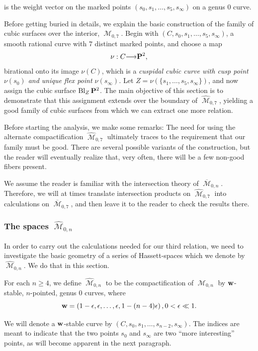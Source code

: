 \documentclass[12pt,reqno]{amsart}
\DeclareMathOperator{\Bl}{Bl}
\DeclareMathOperator{\M}{\mathcal{M}}
\renewcommand{\to}{{\longrightarrow}}
\numberwithin{equation}{section}
\newcommand{\hM}{\widehat{\M}}
\renewcommand {\o}[1]{\overline{#1}}
\begin{document}
is the weight vector on the marked points
$(s_{0}, s_{1}, \dots, s_{5}, s_{\infty})$ on a genus $0$ curve.

Before getting buried in details, we explain the basic construction of
the family of cubic surfaces over the interior, $\M_{0,7}$.  Begin
with $(C, s_{0}, s_{1}, \dots, s_{5}, s_{\infty})$, a smooth rational
curve with $7$ distinct marked points, and choose a map
$$\nu: C \to \P^{2},$$ birational onto its image
$\nu(C)$, which is a {\sl cuspidal cubic curve with cusp point
  $\nu(s_{0})$ and unique flex point $\nu(s_{\infty})$.}  Let
$Z = \nu(\{s_{1}, \dots, s_{5}, s_{\infty}\}) $, and now assign the
cubic surface $\Bl_{Z}\P^{2}$.  The main objective of this section is
to demonstrate that this assignment extends over the boundary of
$\hM_{0,7}$, yielding a good family of cubic surfaces from which we
can extract one more relation.

Before starting the analysis, we make some remarks: The need for using
the alternate compactification $\hM_{0,7}$ ultimately traces to the
requirement that our family must be good.  There are several possible
variants of the construction, but the reader will eventually realize
that, very often, there will be a few non-good fibers present.


We assume the reader is familiar with the intersection theory of
$\o{\M}_{0,n}$.  Therefore, we will at times translate intersection
products on $\hM_{0,7}$ into calculations on $\o{\M}_{0,7}$, and then
leave it to the reader to check the results there.

\subsubsection{The spaces $\hM_{0,n}$}
\label{sec:spaces-hm_0-n}

In order to carry out the calculations needed for our third relation,
we need to investigate the basic geometry of a series of
Hassett-spaces which we denote by $\hM_{0,n}$.  We do that in this
section.

\begin{definition}
  \label{def:hM0n} For each $n \geq 4$, we define $\hM_{0,n}$ to be
  the compactification of $\M_{0,n}$ by ${\bf w}$-stable, $n$-pointed,
  genus $0$ curves, where
  $${\bf w} = \left(1- \epsilon, \epsilon, \dots, \epsilon, 1-(n-4)\epsilon \right), 0 < \epsilon \ll 1.$$
\end{definition}

We will denote a ${\bf w}$-stable curve by
$(C, s_{0}, s_{1}, \dots, s_{n-2}, s_{\infty})$.  The indices are
meant to indicate that the two points $s_{0}$ and $s_{\infty}$ are two
``more interesting'' points, as will become apparent in the next
paragraph.
\end{document}
